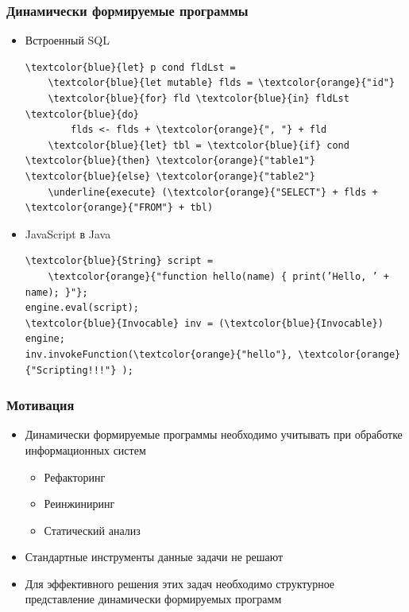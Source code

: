 \documentclass{beamer}
\begin{document}
\begin{frame}[fragile]
    \transwipe[direction=90]
    \frametitle{Динамически формируемые программы}
    \begin{itemize}
        \item Встроенный SQL
\begin{Verbatim}[commandchars=\\\{\}]
\textcolor{blue}{let} p cond fldLst =
    \textcolor{blue}{let mutable} flds = \textcolor{orange}{"id"}
    \textcolor{blue}{for} fld \textcolor{blue}{in} fldLst \textcolor{blue}{do}
        flds <- flds + \textcolor{orange}{", "} + fld 
    \textcolor{blue}{let} tbl = \textcolor{blue}{if} cond \textcolor{blue}{then} \textcolor{orange}{"table1"} \textcolor{blue}{else} \textcolor{orange}{"table2"}    
    \underline{execute} (\textcolor{orange}{"SELECT"} + flds + \textcolor{orange}{"FROM"} + tbl)
\end{Verbatim}
        \item JavaScript в Java
\begin{Verbatim}[commandchars=\\\{\}]
\textcolor{blue}{String} script =
    \textcolor{orange}{"function hello(name) { print(’Hello, ’ + name); }"};
engine.eval(script);
\textcolor{blue}{Invocable} inv = (\textcolor{blue}{Invocable}) engine;
inv.invokeFunction(\textcolor{orange}{"hello"}, \textcolor{orange}{"Scripting!!!"} );
\end{Verbatim}
    \end{itemize}

\end{frame}

\begin{frame}
    \transwipe[direction=90]
    \frametitle{Мотивация}
    \begin{itemize}        
        \item Динамически формируемые программы необходимо учитывать при обработке информационных систем
        \begin{itemize}
            \item Рефакторинг
            \item Реинжиниринг
            \item Статический анализ
        \end{itemize}
        \item Стандартные инструменты данные задачи не решают
        \item Для эффективного решения этих задач необходимо структурное представление динамически формируемых программ
    \end{itemize}
\end{frame}
\end{document}

